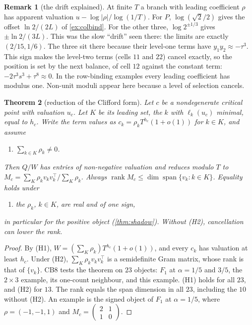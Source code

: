 \documentclass[11pt]{article}
\newtheorem{theorem}{Theorem}\newtheorem{proposition}[theorem]{Proposition}\newtheorem{lemma}[theorem]{Lemma}\newtheorem{corollary}[theorem]{Corollary}\newtheorem{conjecture}[theorem]{Conjecture}\crefname{conjecture}{Conjecture}{Conjectures}
\theoremstyle{definition}\newtheorem{definition}[theorem]{Definition}\newtheorem{remark}[theorem]{Remark}\newtheorem{example}[theorem]{Example}\newtheorem{problem}[theorem]{Open problem}\crefname{problem}{Problem}{Problems}
\begin{document}
\begin{remark}[the drift explained]
At finite $T$ a branch with leading coefficient $\rho$ has apparent valuation $u-\log|\rho|/\log(1/T)$. For $P$, $\log(\sqrt2/2)$ gives the offset $\ln2/(2L)$ of \cref{ex:colbind}. For the other three, $\log2^{\pm1/3}$ gives
$\pm\ln2/(3L)$. This was the slow ``drift'' seen there: the limits are exactly $(2/15,1/6)$. The three sit there because their level-one terms have $y_1y_2\approx-\tau^3$. This sign makes the level-two terms
(cells $11$ and $22$) cancel exactly, so the position is set by the next balance, of cell $12$ against the constant term: $-2\tau^3s^3+\tau^8\approx0$. In the row-binding examples every leading coefficient
has modulus one. Non-unit moduli appear here because a level of selection cancels.
\end{remark}

\begin{theorem}[reduction of the Clifford form]\label{thm:reduction}
Let $c$ be a nondegenerate critical point with valuation $u_c$. Let $K$ be its leading set, the $k$ with $\ell_k(u_c)$ minimal, equal to $h_c$. Write the term values as $c_k=\rho_kT^{h_c}(1+o(1))$ for $k\in K$, and assume
\begin{enumerate}
\item[(H1)] $\sum_{k\in K}\rho_k\ne0$.
\end{enumerate}
Then $Q/W$ has entries of non-negative valuation and reduces modulo $T$ to $M_c=\sum_{K}\rho_kv_kv_k^{\!\top}/\sum_K\rho_k$. Always $\operatorname{rank}M_c\le\dim\operatorname{span}\{v_k:k\in K\}$. Equality holds under
\begin{enumerate}
\item[(H2)] the $\rho_k$, $k\in K$, are real and of one sign,
\end{enumerate}
in particular for the positive object (\cref{thm:shadow}). Without (H2), cancellation can lower the rank.
\end{theorem}

\begin{proof}
By (H1), $W=(\sum_K\rho_k)T^{h_c}(1+o(1))$, and every $c_k$ has valuation at least $h_c$. Under (H2), $\sum_K\rho_kv_kv_k^{\!\top}$ is a semidefinite Gram matrix, whose rank is that of $\{v_k\}$. CB8 tests the theorem on $23$
objects: $F_1$ at $\alpha=1/5$ and $3/5$, the $2\times3$ example, its one-count neighbour, and this example. (H1) holds for all $23$, and (H2) for $13$. The rank equals the span dimension in all $23$, including
the $10$ without (H2). An example is the signed object of $F_1$ at $\alpha=1/5$, where $\rho=(-1,-1,1)$ and $M_c=\left(\begin{smallmatrix}2&1\\1&0\end{smallmatrix}\right)$.
\end{proof}
\end{document}

